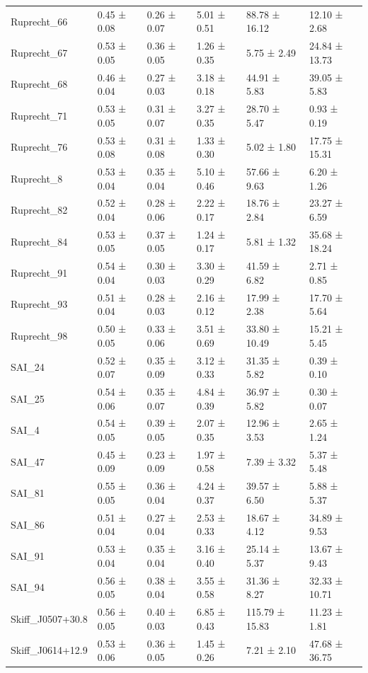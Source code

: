\begin{tabular}{llllll}
Ruprecht_66 & 0.45 ± 0.08 & 0.26 ± 0.07 & 5.01 ± 0.51 & 88.78 ± 16.12 & 12.10 ± 2.68 \\
Ruprecht_67 & 0.53 ± 0.05 & 0.36 ± 0.05 & 1.26 ± 0.35 & 5.75 ± 2.49 & 24.84 ± 13.73 \\
Ruprecht_68 & 0.46 ± 0.04 & 0.27 ± 0.03 & 3.18 ± 0.18 & 44.91 ± 5.83 & 39.05 ± 5.83 \\
Ruprecht_71 & 0.53 ± 0.05 & 0.31 ± 0.07 & 3.27 ± 0.35 & 28.70 ± 5.47 & 0.93 ± 0.19 \\
Ruprecht_76 & 0.53 ± 0.08 & 0.31 ± 0.08 & 1.33 ± 0.30 & 5.02 ± 1.80 & 17.75 ± 15.31 \\
Ruprecht_8 & 0.53 ± 0.04 & 0.35 ± 0.04 & 5.10 ± 0.46 & 57.66 ± 9.63 & 6.20 ± 1.26 \\
Ruprecht_82 & 0.52 ± 0.04 & 0.28 ± 0.06 & 2.22 ± 0.17 & 18.76 ± 2.84 & 23.27 ± 6.59 \\
Ruprecht_84 & 0.53 ± 0.05 & 0.37 ± 0.05 & 1.24 ± 0.17 & 5.81 ± 1.32 & 35.68 ± 18.24 \\
Ruprecht_91 & 0.54 ± 0.04 & 0.30 ± 0.03 & 3.30 ± 0.29 & 41.59 ± 6.82 & 2.71 ± 0.85 \\
Ruprecht_93 & 0.51 ± 0.04 & 0.28 ± 0.03 & 2.16 ± 0.12 & 17.99 ± 2.38 & 17.70 ± 5.64 \\
Ruprecht_98 & 0.50 ± 0.05 & 0.33 ± 0.06 & 3.51 ± 0.69 & 33.80 ± 10.49 & 15.21 ± 5.45 \\
SAI_24 & 0.52 ± 0.07 & 0.35 ± 0.09 & 3.12 ± 0.33 & 31.35 ± 5.82 & 0.39 ± 0.10 \\
SAI_25 & 0.54 ± 0.06 & 0.35 ± 0.07 & 4.84 ± 0.39 & 36.97 ± 5.82 & 0.30 ± 0.07 \\
SAI_4 & 0.54 ± 0.05 & 0.39 ± 0.05 & 2.07 ± 0.35 & 12.96 ± 3.53 & 2.65 ± 1.24 \\
SAI_47 & 0.45 ± 0.09 & 0.23 ± 0.09 & 1.97 ± 0.58 & 7.39 ± 3.32 & 5.37 ± 5.48 \\
SAI_81 & 0.55 ± 0.05 & 0.36 ± 0.04 & 4.24 ± 0.37 & 39.57 ± 6.50 & 5.88 ± 5.37 \\
SAI_86 & 0.51 ± 0.04 & 0.27 ± 0.04 & 2.53 ± 0.33 & 18.67 ± 4.12 & 34.89 ± 9.53 \\
SAI_91 & 0.53 ± 0.04 & 0.35 ± 0.04 & 3.16 ± 0.40 & 25.14 ± 5.37 & 13.67 ± 9.43 \\
SAI_94 & 0.56 ± 0.05 & 0.38 ± 0.04 & 3.55 ± 0.58 & 31.36 ± 8.27 & 32.33 ± 10.71 \\
Skiff_J0507+30.8 & 0.56 ± 0.05 & 0.40 ± 0.03 & 6.85 ± 0.43 & 115.79 ± 15.83 & 11.23 ± 1.81 \\
Skiff_J0614+12.9 & 0.53 ± 0.06 & 0.36 ± 0.05 & 1.45 ± 0.26 & 7.21 ± 2.10 & 47.68 ± 36.75 \\

\end{tabular}
